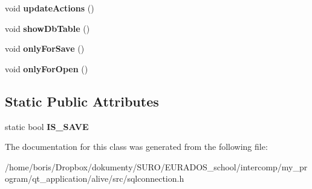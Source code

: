 \begin{DoxyCompactItemize}
\item 
\hypertarget{classSqlConnection_a1f632f61a1baa84358b04600fd5cf1c6}{void {\bfseries update\-Actions} ()}\label{classSqlConnection_a1f632f61a1baa84358b04600fd5cf1c6}

\item 
\hypertarget{classSqlConnection_aa6435ff7a964d00418457111f6f33380}{void {\bfseries show\-Db\-Table} ()}\label{classSqlConnection_aa6435ff7a964d00418457111f6f33380}

\item 
\hypertarget{classSqlConnection_ab497606fdbaefeedf5c9d4223fea3a1d}{void {\bfseries only\-For\-Save} ()}\label{classSqlConnection_ab497606fdbaefeedf5c9d4223fea3a1d}

\item 
\hypertarget{classSqlConnection_a859135cab392d805adc40a58f6d0adf9}{void {\bfseries only\-For\-Open} ()}\label{classSqlConnection_a859135cab392d805adc40a58f6d0adf9}

\end{DoxyCompactItemize}
\subsection*{Static Public Attributes}
\begin{DoxyCompactItemize}
\item 
\hypertarget{classSqlConnection_a0d53b0970637eed7f37c8190fdb2095a}{static bool {\bfseries I\-S\-\_\-\-S\-A\-V\-E}}\label{classSqlConnection_a0d53b0970637eed7f37c8190fdb2095a}

\end{DoxyCompactItemize}


The documentation for this class was generated from the following file\-:\begin{DoxyCompactItemize}
\item 
/home/boris/\-Dropbox/dokumenty/\-S\-U\-R\-O/\-E\-U\-R\-A\-D\-O\-S\-\_\-school/intercomp/my\-\_\-program/qt\-\_\-application/alive/src/sqlconnection.\-h\end{DoxyCompactItemize}
